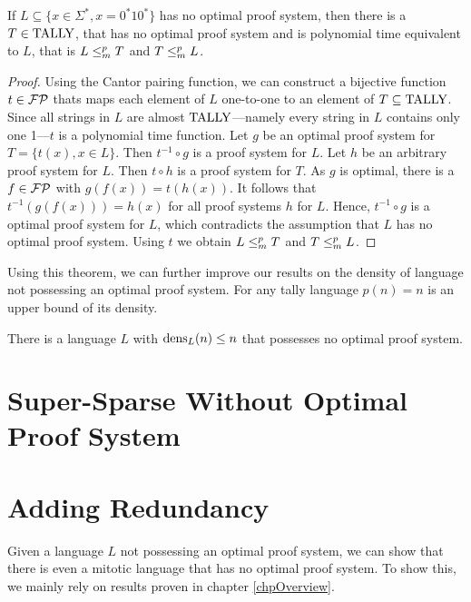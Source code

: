   \begin{theorem}
    If \(L \subseteq \{ x \in \Sigma^*, x = 0^*10^* \}\) has no optimal proof system, then there is a \(T \in \text{TALLY}\), that has no optimal proof system and is polynomial time equivalent to \(L\), that is \(L \leq_{m}^{p} T\) and \(T \leq_{m}^{p} L\).
  \end{theorem}

  \begin{proof}
    Using the Cantor pairing function, we can construct a bijective function \(t \in \mathcal{FP}\) thats maps each element of \(L\) one-to-one to an element of \(T \subseteq \text{TALLY}\). Since all strings in \(L\) are almost \(\text{TALLY}\)---namely every string in \(L\) contains only one 1---\(t\) is a polynomial time function. Let \(g\) be an optimal proof system for \(T = \{ t(x), x \in L \}\). Then \(t^{-1} \circ g\) is a proof system for \(L\). Let \(h\) be an arbitrary proof system for \(L\). Then \(t \circ h\) is a proof system for \(T\). As \(g\) is optimal, there is a \(f \in \mathcal{FP}\) with \(g(f(x)) = t(h(x))\). It follows that \(t^{-1}(g(f(x))) = h(x)\) for all proof systems \(h\) for \(L\). Hence, \(t^{-1} \circ g\) is a optimal proof system for \(L\), which contradicts the assumption that \(L\) has no optimal proof system. Using \(t\) we obtain \(L \leq_{m}^{p} T\) and \(T \leq_{m}^{p} L\).
  \end{proof}
  
  Using this theorem, we can further improve our results on the density of language not possessing an optimal proof system. For any tally language \(p(n) = n\) is an upper bound of its density.

  \begin{corollary}
    There is a language \(L\) with \(\operatorname{dens}_L(n) \leq n\) that possesses no optimal proof system.
  \end{corollary}

  \section{Super-Sparse Without Optimal Proof System}

  \section{Adding Redundancy}

  Given a language \(L\) not possessing an optimal proof system, we can show that there is even a mitotic language that has no optimal proof system. To show this, we mainly rely on results proven in chapter \ref{chpOverview}.

